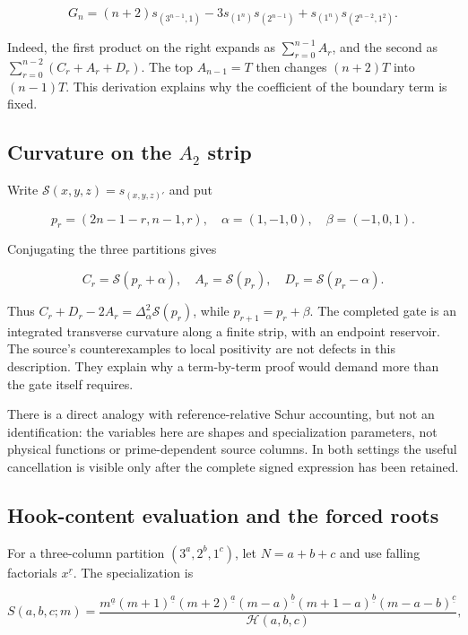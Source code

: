 \documentclass[
  10pt,
  a4paper,
  10pt,
  oneside,
  openany]{book}
\begin{document}
\[
 G_n=(n+2)s_{(3^{n-1},1)}
 -3s_{(1^n)}s_{(2^{n-1})}
 +s_{(1^n)}s_{(2^{n-2},1^2)}.
 \tag{24.2}\label{eq:24.2}
\]

Indeed, the first product on the right expands as
\(\sum_{r=0}^{n-1}A_r\), and the second as
\(\sum_{r=0}^{n-2}(C_r+A_r+D_r)\). The top \(A_{n-1}=T\) then changes
\((n+2)T\) into \((n-1)T\). This derivation explains why the coefficient
of the boundary term is fixed.

\subsection{\texorpdfstring{Curvature on the \(A_2\)
strip}{Curvature on the A\_2 strip}}\label{curvature-on-the-a_2-strip}

Write \(\mathscr S(x,y,z)=s_{(x,y,z)'}\) and put

\[
 p_r=(2n-1-r,n-1,r),\quad
 \alpha=(1,-1,0),\quad\beta=(-1,0,1).
\]

Conjugating the three partitions gives

\[
 C_r=\mathscr S(p_r+\alpha),\quad
 A_r=\mathscr S(p_r),\quad
 D_r=\mathscr S(p_r-\alpha).
\]

Thus \(C_r+D_r-2A_r=\Delta_\alpha^2\mathscr S(p_r)\), while
\(p_{r+1}=p_r+\beta\). The completed gate is an integrated transverse
curvature along a finite strip, with an endpoint reservoir. The source's
counterexamples to local positivity are not defects in this description.
They explain why a term-by-term proof would demand more than the gate
itself requires.

There is a direct analogy with reference-relative Schur accounting, but
not an identification: the variables here are shapes and specialization
parameters, not physical functions or prime-dependent source columns. In
both settings the useful cancellation is visible only after the complete
signed expression has been retained.

\subsection{Hook-content evaluation and the forced
roots}\label{hook-content-evaluation-and-the-forced-roots}

For a three-column partition \((3^a,2^b,1^c)\), let \(N=a+b+c\) and use
falling factorials \(x^{\underline r}\). The specialization is

\[
 S(a,b,c;m)=
 \frac{m^{\underline a}(m+1)^{\underline a}(m+2)^{\underline a}
 (m-a)^{\underline b}(m+1-a)^{\underline b}
 (m-a-b)^{\underline c}}{\mathcal H(a,b,c)},
 \tag{24.3}\label{eq:24.3}
\]
\end{document}
